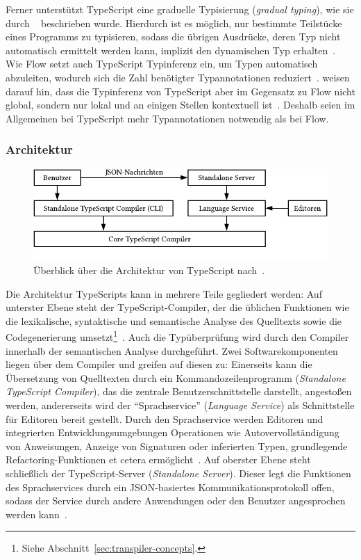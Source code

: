 Ferner unterstützt TypeScript eine graduelle Typisierung (\textit{gradual typing}), wie sie durch \citeauthor{SIEK:2007}~\autocite{SIEK:2007} beschrieben wurde. Hierdurch ist es möglich, nur bestimmte Teilstücke eines Programms zu typisieren, sodass die übrigen Ausdrücke, deren Typ nicht automatisch ermittelt werden kann, implizit den dynamischen Typ  erhalten~\autocite{TYPESCRIPT:DESIGN_GOALS}.
Wie Flow setzt auch TypeScript Typinferenz ein, um Typen automatisch abzuleiten, wodurch sich die Zahl benötigter Typannotationen reduziert~\autocite[4]{BIERMAN:2014}. \citeauthor{FLOW:PAPER} weisen darauf hin, dass die Typinferenz von TypeScript aber im Gegensatz zu Flow nicht global, sondern nur lokal und an einigen Stellen kontextuell ist~\autocite[24]{FLOW:PAPER}. Deshalb seien im Allgemeinen bei TypeScript mehr Typannotationen notwendig als bei Flow.

\subsubsection{Architektur}

\bigbreak
\begin{figure}[htb]
  \includegraphics[width=.75\textwidth]{src/2_Grundlagen/fig/ts-architecture.pdf}
  \caption{Überblick über die Architektur von TypeScript nach~\autocite{TYPESCRIPT:ARCHITECTURE}.}
	\label{fig:ts-architecture}
\end{figure}

Die Architektur TypeScripts kann in mehrere Teile gegliedert werden: Auf unterster Ebene steht der TypeScript-Compiler, der die üblichen Funktionen wie die lexikalische, syntaktische und semantische Analyse des Quelltexts sowie die Codegenerierung umsetzt\footnote{Siehe Abschnitt~\ref{sec:transpiler-concepts}.}~\autocite{TYPESCRIPT:ARCHITECTURE}. Auch die Typüberprüfung wird durch den Compiler innerhalb der semantischen Analyse durchgeführt. Zwei Softwarekomponenten liegen über dem Compiler und greifen auf diesen zu: Einerseits kann die Übersetzung von Quelltexten durch ein Kommandozeilenprogramm (\textit{Standalone TypeScript Compiler}), das die zentrale Benutzerschnittstelle darstellt, angestoßen werden, andererseits wird der \enquote{Sprachservice} (\textit{Language Service}) als Schnittstelle für Editoren bereit gestellt. Durch den Sprachservice werden Editoren und integrierten Entwicklungsumgebungen Operationen wie Autovervollständigung von Anweisungen, Anzeige von Signaturen oder inferierten Typen, grundlegende Refactoring-Funktionen et cetera ermöglicht~\autocite{TYPESCRIPT:ARCHITECTURE}. Auf oberster Ebene steht schließlich der TypeScript-Server (\textit{Standalone Server}). Dieser legt die Funktionen des Sprachservices durch ein JSON-basiertes Kommunikationsprotokoll offen, sodass der Service durch andere Anwendungen oder den Benutzer angesprochen werden kann~\autocite{TYPESCRIPT:TSSERVER}.

